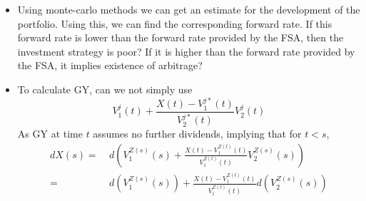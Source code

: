 \documentclass[12pt]{article}
\theoremstyle{my_thm}
\theoremstyle{my_rem}
\begin{document}
\begin{itemize}
\item Using monte-carlo methods we can get an estimate for the development of the portfolio. Using this, we can find the corresponding forward rate. If this forward rate is lower than the forward rate provided by the FSA, then the investment strategy is poor? If it is higher than the forward rate provided by the FSA, it implies existence of arbitrage?
\item To calculate GY, can we not simply use
$$
V_1^j(t)+\frac{X(t)-V_1^{j*}(t)}{V_2^{j*}(t)}V_2^{j}(t)
$$
As GY at time $t$ assumes no further dividends, implying that for $t<s$,
\begin{align*}
dX(s)
= \ & 
d\left(V_1^{Z(s)}(s)+\frac{X(t)-V_1^{Z(t)}(t)}{V_1^{Z(t)}(t)}V_2^{Z(s)}(s)\right)
\\
= \ &
d(V_1^{Z(s)}(s))+\frac{X(t)-V_1^{Z(t)}(t)}{V_1^{Z(t)}(t)}d(V_2^{Z(s)}(s))
\end{align*}
\end{itemize}
\newpage
\end{document}
